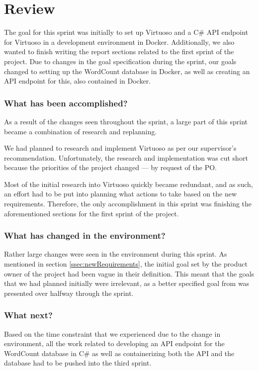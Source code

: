 \section{Review}
The goal for this sprint was initially to set up Virtuoso and a C\# API endpoint for Virtuoso in a development environment in Docker. 
Additionally, we also wanted to finish writing the report sections related to the first sprint of the \knox{} project. 
Due to changes in the goal specification during the sprint, our goals changed to setting up the WordCount database in Docker, as well as creating an API endpoint for this, also contained in Docker.

\subsubsection*{What has been accomplished?}
As a result of the changes seen throughout the sprint, a large part of this sprint became a combination of research and replanning. 

We had planned to research and implement Virtuoso as per our supervisor's recommendation.
Unfortunately, the research and implementation was cut short because the priorities of the \knox{} project changed --- by request of the \knox{} PO.

Most of the initial research into Virtuoso quickly became redundant, and as such, an effort had to be put into planning what actions to take based on the new requirements. 
Therefore, the only accomplishment in this sprint was finishing the aforementioned sections for the first sprint of the \knox{} project.  



\subsubsection*{What has changed in the environment?}
Rather large changes were seen in the environment during this sprint. As mentioned in section \ref{ssec:newRequirements}, the initial goal set by the product owner of the \knox{} project had been vague in their definition. 
This meant that the goals that we had planned initially were irrelevant, as a better specified goal from \knox{} was presented over halfway through the sprint. 

\subsubsection*{What next?}
Based on the time constraint that we experienced due to the change in environment, all the work related to developing an API endpoint for the WordCount database in C\# as well as containerizing both the API and the database had to be pushed into the third sprint.
